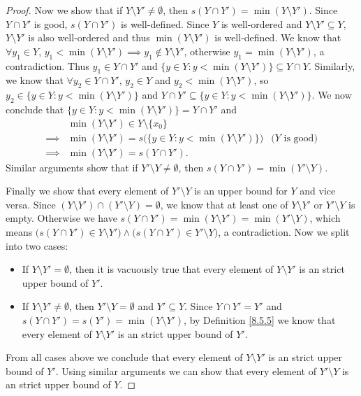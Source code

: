 \begin{proof}
    Now we show that if \(Y \setminus Y' \neq \emptyset\), then \(s(Y \cap Y') = \min(Y \setminus Y')\).
    Since \(Y \cap Y'\) is good, \(s(Y \cap Y')\) is well-defined.
    Since \(Y\) is well-ordered and \(Y \setminus Y' \subseteq Y\), \(Y \setminus Y'\) is also well-ordered and thus \(\min(Y \setminus Y')\) is well-defined.
    We know that \(\forall y_1 \in Y\), \(y_1 < \min(Y \setminus Y') \implies y_1 \notin Y \setminus Y'\), otherwise \(y_1 = \min(Y \setminus Y')\), a contradiction.
    Thus \(y_1 \in Y \cap Y'\) and \(\{y \in Y : y < \min(Y \setminus Y')\} \subseteq Y \cap Y\).
    Similarly, we know that \(\forall y_2 \in Y \cap Y'\), \(y_2 \in Y\) and \(y_2 < \min(Y \setminus Y')\), so \(y_2 \in \{y \in Y : y < \min(Y \setminus Y')\}\) and \(Y \cap Y' \subseteq \{y \in Y : y < \min(Y \setminus Y')\}\).
    We now conclude that \(\{y \in Y : y < \min(Y \setminus Y')\} = Y \cap Y'\) and
    \begin{align*}
                 & \min(Y \setminus Y') \in Y \setminus \{x_0\}                                                      \\
        \implies & \min(Y \setminus Y') = s\big(\{y \in Y : y < \min(Y \setminus Y')\}\big) & \text{(\(Y\) is good)} \\
        \implies & \min(Y \setminus Y') = s(Y \cap Y').
    \end{align*}
    Similar arguments show that if \(Y' \setminus Y \neq \emptyset\), then \(s(Y \cap Y') = \min(Y' \setminus Y)\).

    Finally we show that every element of \(Y' \setminus Y\) is an upper bound for \(Y\) and vice versa.
    Since \((Y \setminus Y') \cap (Y' \setminus Y) = \emptyset\), we know that at least one of \(Y \setminus Y'\) or \(Y' \setminus Y\) is empty.
    Otherwise we have \(s(Y \cap Y') = \min(Y \setminus Y') = \min(Y' \setminus Y)\), which means \(\big(s(Y \cap Y') \in Y \setminus Y'\big) \land \big(s(Y \cap Y') \in Y' \setminus Y\big)\), a contradiction.
    Now we split into two cases:
    \begin{itemize}
        \item If \(Y \setminus Y' = \emptyset\), then it is vacuously true that every element of \(Y \setminus Y'\) is an strict upper bound of \(Y'\).
        \item If \(Y \setminus Y' \neq \emptyset\), then \(Y' \setminus Y = \emptyset\) and \(Y' \subseteq Y\).
              Since \(Y \cap Y' = Y'\) and \(s(Y \cap Y') = s(Y') = \min(Y \setminus Y')\), by Definition \ref{8.5.5} we know that every element of \(Y \setminus Y'\) is an strict upper bound of \(Y'\).
    \end{itemize}
    From all cases above we conclude that every element of \(Y \setminus Y'\) is an strict upper bound of \(Y'\).
    Using similar arguments we can show that every element of \(Y' \setminus Y\) is an strict upper bound of \(Y\).
\end{proof}

